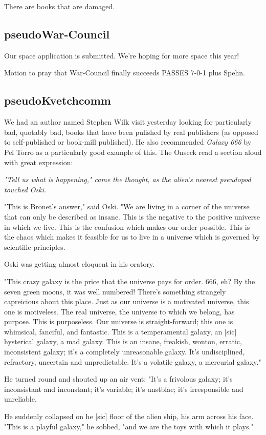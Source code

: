 \documentclass[10pt]{article}
\newcommand{\ps}{ plus Spehn\xspace}
\begin{document}
There are books that are damaged.

\subsection*{pseudoWar-Council}

Our space application is submitted.  We're hoping for more space
this year!

Motion to pray that War-Council finally succeeds PASSES 7-0-1\ps.

\subsection*{pseudoKvetchcomm}

We had an author named Stephen Wilk visit yesterday looking for particularly
bad, quotably bad, books that have been pulished by real publishers (as opposed
to self-published or book-mill published).  He also recommended \emph{Galaxy
666} by Pel Torro as a particularly good example of this.  The Onseck read a section
aloud with great expression:

{\it
"Tell us what is happening," came the thought, as the alien's nearest pseudopod
touched Oski.

"This is Bronet's answer," said Oski.  "We are living in a corner of the 
universe that can only be described as
insane.  This is the negative to the positive universe in which we live.
This is the confusion which makes our order possible.  This is the chaos which
makes it feasible for us to live in a universe which is governed by scientific
principles.

Oski was getting almost eloquent in his oratory.

"This crazy galaxy is the price that the universe pays for order.  666,
eh?  By the seven green moons, it was well numbered!  There's something strangely
capreicious about this place.  Just as our universe is a motivated universe, this
one is motiveless.  The real universe, the universe to which we belong, has purpose.
This is purposeless.  Our universe is straight-forward; this one is whimsical,
fanciful, and fantastic.  This is a temperamental galaxy, an [sic] hysterical
galaxy, a mad galaxy.  This is an insane, freakish, wonton, erratic, inconsistent
galaxy; it's a completely unreasonable galaxy.  It's undisciplined, refractory, 
uncertain and unpredictable.  It's a volatile galaxy, a mercurial galaxy."

He turned round and shouted up an air vent: "It's a frivolous galaxy; it's inconsistant
and inconstant; it's variable; it's unstblae; it's irresponsible and unreliable.

He suddenly collapsed on he [sic] floor of the alien ship, his arm across his
face.  "This is a playful galaxy," he sobbed, "and we are the toys with which
it plays."}
\end{document}
